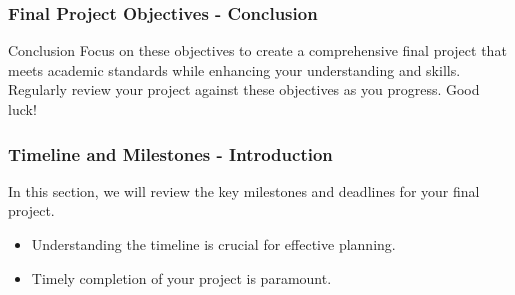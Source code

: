 \documentclass{beamer}
\begin{document}
\begin{frame}[fragile]
    \frametitle{Final Project Objectives - Conclusion}
    \begin{block}{Conclusion}
        Focus on these objectives to create a comprehensive final project that meets academic standards while enhancing your understanding and skills. Regularly review your project against these objectives as you progress. Good luck!
    \end{block}
\end{frame}

\begin{frame}[fragile]
    \frametitle{Timeline and Milestones - Introduction}
    In this section, we will review the key milestones and deadlines for your final project.
    \begin{itemize}
        \item Understanding the timeline is crucial for effective planning.
        \item Timely completion of your project is paramount.
    \end{itemize}
\end{frame}
\end{document}
